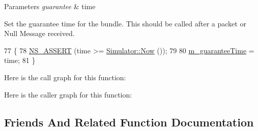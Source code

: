 \begin{DoxyParams}{Parameters}
{\em guarantee} & time\\
\hline
\end{DoxyParams}
Set the guarantee time for the bundle. This should be called after a packet or Null Message received. 
\begin{DoxyCode}
77 \{
78   \hyperlink{assert_8h_a6dccdb0de9b252f60088ce281c49d052}{NS\_ASSERT} (time >= \hyperlink{classns3_1_1Simulator_ac3178fa975b419f7875e7105be122800}{Simulator::Now} ());
79 
80   \hyperlink{classns3_1_1RemoteChannelBundle_acd2adaa59c29d3a4bf94dba13a563ebf}{m\_guaranteeTime} = time;
81 \}
\end{DoxyCode}


Here is the call graph for this function\+:




Here is the caller graph for this function\+:




\subsection{Friends And Related Function Documentation}
